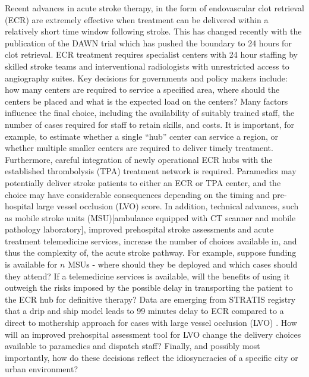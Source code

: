 \documentclass[utf8]{frontiersHLTH}
\begin{document}
Recent advances in acute stroke therapy, in the form of endovascular
clot retrieval
(ECR)\cite{berkhemer2015randomized,goyal2016endovascular,goyal2015randomized,campbell2015endovascular,saver2015stent}
are extremely effective when treatment can be delivered within a
relatively short time window following stroke. This has changed
recently with the publication of the DAWN trial which has pushed the
boundary to 24 hours for clot
retrieval\cite{nogueira2018thrombectomy}. ECR treatment requires
specialist centers with 24 hour staffing by skilled stroke teams and
interventional radiologists with unrestricted access to angiography
suites. Key decisions for governments and policy makers include: how
many centers are required to service a specified area, where should
the centers be placed and what is the expected load on the centers?\cite{Phan_2017}
Many factors influence the final choice, including the availability of
suitably trained staff, the number of cases required for staff to
retain skills, and costs. It is important, for example, to estimate
whether a single ``hub'' center can service a region, or whether
multiple smaller centers are required to deliver timely
treatment. Furthermore, careful integration of newly operational ECR
hubs with the established thrombolysis (TPA) treatment network is
required\cite{tnionda1995tissue}. Paramedics may potentially deliver
stroke patients to either an ECR or TPA center, and the choice may
have considerable consequences depending on the timing and
pre-hospital large vessel occlusion (LVO) score. In addition,
technical advances, such as mobile stroke units (MSU)[ambulance
  equipped with CT scanner and mobile pathology laboratory], improved
prehospital stroke assessments and acute treatment telemedicine
services, increase the number of choices available in, and thus the
complexity of, the acute stroke pathway. For example, suppose funding
is available for $n$ MSUs - where should they be deployed and which
cases should they attend? If a telemedicine services is available,
will the benefits of using it outweigh the risks imposed by the
possible delay in transporting the patient to the ECR hub for
definitive therapy? Data are emerging from STRATIS registry that a
drip and ship model leads to 99 minutes delay to ECR compared to a
direct to mothership approach for cases with large vessel occlusion
(LVO) \cite{froehler2017interhospital}.  How will an improved
prehospital assessment tool for LVO change the delivery choices
available to paramedics and dispatch staff? Finally, and possibly most
importantly, how do these decisions reflect the idiosyncracies of a
specific city or urban environment?
\end{document}
